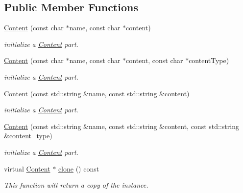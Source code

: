 \subsection*{Public Member Functions}
\begin{DoxyCompactItemize}
\item 
\hyperlink{classcurlpp_1_1FormParts_1_1Content_af3320998888d4c4fc85cd86f5c45efd1}{Content} (const char $\ast$name, const char $\ast$content)
\begin{DoxyCompactList}\small\item\em initialize a \hyperlink{classcurlpp_1_1FormParts_1_1Content}{Content} part. \end{DoxyCompactList}\item 
\hyperlink{classcurlpp_1_1FormParts_1_1Content_a0119ef3e6fa340b97290c583fd37c21e}{Content} (const char $\ast$name, const char $\ast$content, const char $\ast$content\-Type)
\begin{DoxyCompactList}\small\item\em initialize a \hyperlink{classcurlpp_1_1FormParts_1_1Content}{Content} part. \end{DoxyCompactList}\item 
\hyperlink{classcurlpp_1_1FormParts_1_1Content_ac6e7023fae2473a99f319268169c9a80}{Content} (const std\-::string \&name, const std\-::string \&content)
\begin{DoxyCompactList}\small\item\em initialize a \hyperlink{classcurlpp_1_1FormParts_1_1Content}{Content} part. \end{DoxyCompactList}\item 
\hyperlink{classcurlpp_1_1FormParts_1_1Content_aecf63e8855b456f85ed8c6d79937816f}{Content} (const std\-::string \&name, const std\-::string \&content, const std\-::string \&content\-\_\-type)
\begin{DoxyCompactList}\small\item\em initialize a \hyperlink{classcurlpp_1_1FormParts_1_1Content}{Content} part. \end{DoxyCompactList}\item 
\hypertarget{classcurlpp_1_1FormParts_1_1Content_afa21c3f33681eea4914a4055d108fc79}{virtual \hyperlink{classcurlpp_1_1FormParts_1_1Content}{Content} $\ast$ \hyperlink{classcurlpp_1_1FormParts_1_1Content_afa21c3f33681eea4914a4055d108fc79}{clone} () const }\label{classcurlpp_1_1FormParts_1_1Content_afa21c3f33681eea4914a4055d108fc79}

\begin{DoxyCompactList}\small\item\em This function will return a copy of the instance. \end{DoxyCompactList}\end{DoxyCompactItemize}
